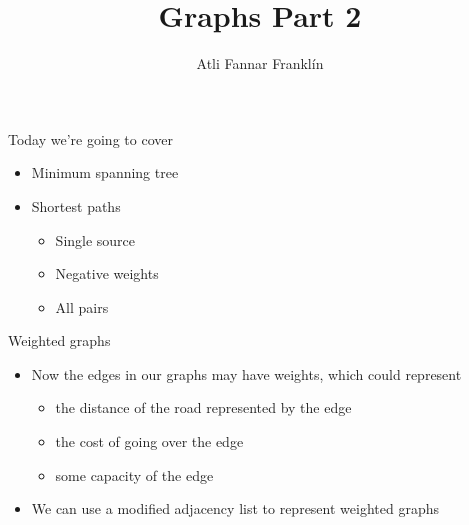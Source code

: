 \documentclass{beamer}
\title{Graphs Part 2}
\author{Atli Fannar Franklín}
\institute{\href{http://ru.is/td}{School of Computer Science} \\[2pt] \href{http://ru.is}{Reykjavík University}}
\begin{document}
\maketitle

\begin{frame}[plain]{Today we're going to cover}
    \begin{itemize}
        \item Minimum spanning tree
        \item Shortest paths
        \begin{itemize}
        \item Single source
        \item Negative weights
        \item All pairs
        \end{itemize}
    \end{itemize}
\end{frame}

\begin{frame}[plain]{Weighted graphs}
    \begin{itemize}
        \item Now the edges in our graphs may have weights, which could represent
            \begin{itemize}
                \item the distance of the road represented by the edge
                \item the cost of going over the edge
                \item some capacity of the edge
            \end{itemize}

        \item We can use a modified adjacency list to represent weighted graphs
    \end{itemize}
\end{frame}
\end{document}
